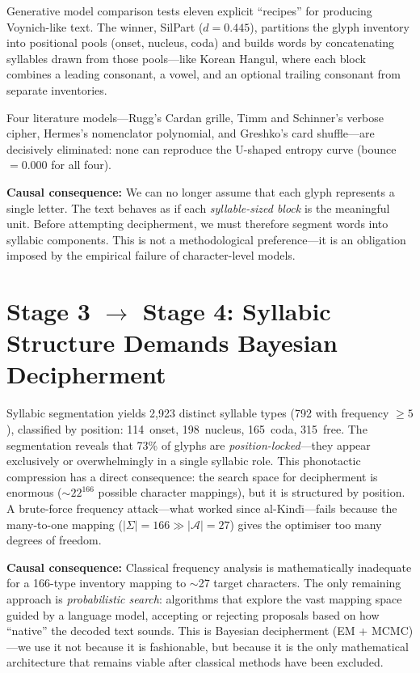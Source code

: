 \documentclass[11pt,a4paper]{article}
\begin{document}
Generative model comparison tests eleven explicit ``recipes'' for producing Voynich-like text.  The winner, SilPart ($d = 0.445$), partitions the glyph inventory into positional pools (onset, nucleus, coda) and builds words by concatenating syllables drawn from those pools---like Korean Hangul, where each block combines a leading consonant, a vowel, and an optional trailing consonant from separate inventories.

Four literature models---Rugg's Cardan grille, Timm and Schinner's verbose cipher, Hermes's nomenclator polynomial, and Greshko's card shuffle---are decisively eliminated: none can reproduce the U-shaped entropy curve (bounce $= 0.000$ for all four).

\noindent\textbf{Causal consequence:} We can no longer assume that each glyph represents a single letter.  The text behaves as if each \emph{syllable-sized block} is the meaningful unit.  Before attempting decipherment, we must therefore segment words into syllabic components.  This is not a methodological preference---it is an obligation imposed by the empirical failure of character-level models.


\section{Stage 3 $\to$ Stage 4: Syllabic Structure Demands Bayesian Decipherment}

Syllabic segmentation yields 2,923 distinct syllable types (792 with frequency $\geq 5$), classified by position: 114~onset, 198~nucleus, 165~coda, 315~free.  The segmentation reveals that 73\% of glyphs are \emph{position-locked}---they appear exclusively or overwhelmingly in a single syllabic role.  This phonotactic compression has a direct consequence: the search space for decipherment is enormous ($\sim$$22^{166}$ possible character mappings), but it is structured by position.  A brute-force frequency attack---what worked since al-Kind\=\i---fails because the many-to-one mapping ($|\Sigma| = 166 \gg |\mathcal{A}| = 27$) gives the optimiser too many degrees of freedom.

\noindent\textbf{Causal consequence:} Classical frequency analysis is mathematically inadequate for a 166-type inventory mapping to $\sim$27 target characters.  The only remaining approach is \emph{probabilistic search}: algorithms that explore the vast mapping space guided by a language model, accepting or rejecting proposals based on how ``native'' the decoded text sounds.  This is Bayesian decipherment (EM + MCMC)---we use it not because it is fashionable, but because it is the only mathematical architecture that remains viable after classical methods have been excluded.
\end{document}
